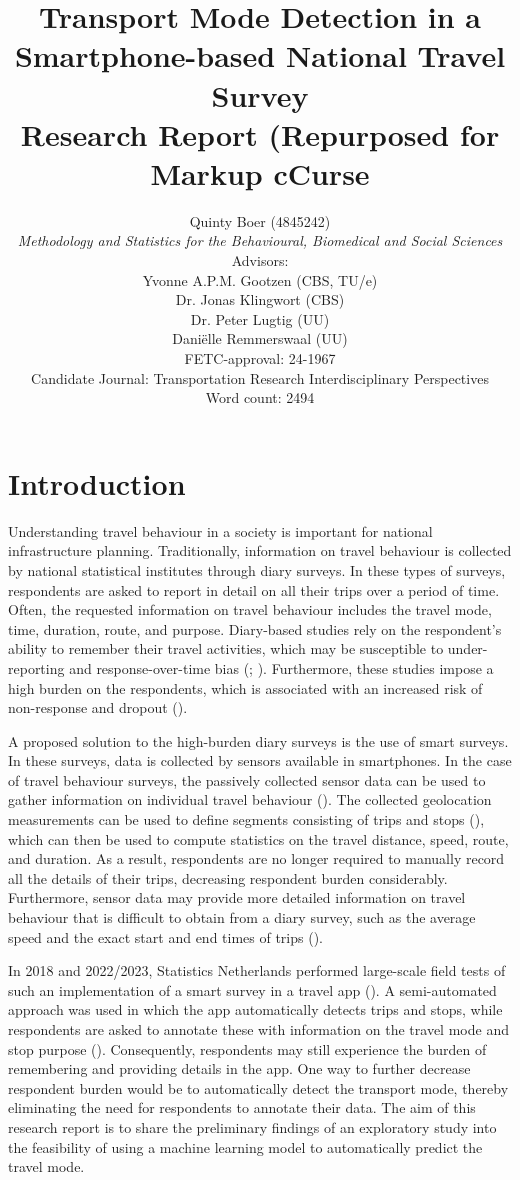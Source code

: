 \documentclass[10pt, a4paper, titlepage, hidelinks]{article}
\title{Transport Mode Detection in a Smartphone-based National Travel Survey \\[0.5cm] \normalsize Research Report (Repurposed for Markup cCurse}
\author{Quinty Boer (4845242) \\ \normalsize \textit{Methodology and Statistics for the Behavioural, Biomedical and Social Sciences} \\[1cm] Advisors: \\ Yvonne A.P.M. Gootzen (CBS, TU/e) \\ Dr. Jonas Klingwort (CBS) \\ Dr. Peter Lugtig (UU) \\ Daniëlle Remmerswaal (UU) \\[1cm] FETC-approval: 24-1967 \\[1cm] \normalsize Candidate Journal: Transportation Research Interdisciplinary Perspectives \\[1cm] \normalsize Word count: 2494}
\date{}
\begin{document}
\maketitle
\newpage

\section{Introduction}


Understanding travel behaviour in a society is important for national infrastructure planning. Traditionally, information on travel behaviour is collected by national statistical institutes through diary surveys. In these types of surveys, respondents are asked to report in detail on all their trips over a period of time. Often, the requested information on travel behaviour includes the travel mode, time, duration, route, and purpose. Diary-based studies rely on the respondent's ability to remember their travel activities, which may be susceptible to under-reporting and response-over-time bias (\cite{mccool2021}; \cite{prelipcean2018}). Furthermore, these studies impose a high burden on the respondents, which is associated with an increased risk of non-response and dropout (\cite{wang2024}).

A proposed solution to the high-burden diary surveys is the use of smart surveys. In these surveys, data is collected by sensors available in smartphones. In the case of travel behaviour surveys, the passively collected sensor data can be used to gather information on individual travel behaviour (\cite{yang2018}). The collected geolocation measurements can be used to define segments consisting of trips and stops (\cite{safi2016}), which can then be used to compute statistics on the travel distance, speed, route, and duration. As a result, respondents are no longer required to manually record all the details of their trips, decreasing respondent burden considerably. Furthermore, sensor data may provide more detailed information on travel behaviour that is difficult to obtain from a diary survey, such as the average speed and the exact start and end times of trips (\cite{nahmias-biran2018}).

In 2018 and 2022/2023, Statistics Netherlands performed large-scale field tests of such an implementation of a smart survey in a travel app (\cite{Schouten2024}). A semi-automated approach was used in which the app automatically detects trips and stops, while respondents are asked to annotate these with information on the travel mode and stop purpose (\cite{zahroh2025}). Consequently, respondents may still experience the burden of remembering and providing details in the app. One way to further decrease respondent burden would be to automatically detect the transport mode, thereby eliminating the need for respondents to annotate their data. The aim of this research report is to share the preliminary findings of an exploratory study into the feasibility of using a machine learning model to automatically predict the travel mode.
\end{document}
